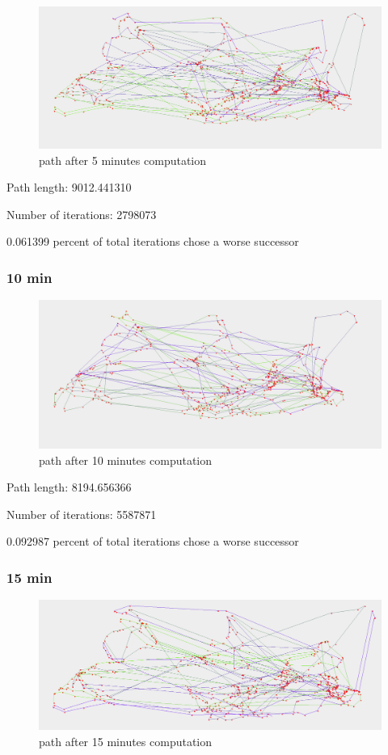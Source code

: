 \documentclass[paper=a4, fontsize=11pt]{scrartcl} %
\numberwithin{equation}{section} %
\numberwithin{figure}{section} %
\numberwithin{table}{section} %
\begin{document}
\begin{figure}[h]
\includegraphics[width=\textwidth]{5min.png}
\caption{path after 5 minutes computation}
\label{tenMin}
\end{figure}

Path length: 9012.441310

Number of iterations: 2798073

0.061399 percent of total iterations chose a worse successor

\subsubsection{10 min}

\begin{figure}[h]
\includegraphics[width=\textwidth]{10min.png}
\caption{path after 10 minutes computation}
\label{tenMin}
\end{figure}

Path length: 8194.656366

Number of iterations: 5587871

0.092987 percent of total iterations chose a worse successor

\subsubsection{15 min}

\begin{figure}[h]
\includegraphics[width=\textwidth]{15min.png}
\caption{path after 15 minutes computation}
\label{tenMin}
\end{figure}
\end{document}
